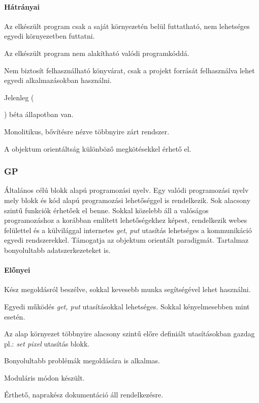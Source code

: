 \documentclass[12pt,a4paper,oneside]{report} %
\begin{document}
\paragraph{Hátrányai} 
\begin{compactitem}
	\item Az elkészült program csak a saját környezetén belül futtatható, nem lehetséges egyedi környezetben futtatni.
	\item Az elkészült program nem alakítható valódi programkóddá.
	\item Nem biztosít felhasználható könyvárat, csak a projekt forrását felhasználva lehet egyedi alkalmazásokban használni.
	\item Jelenleg (\date{\today}) béta állapotban van.
	\item Monolitikus, bővítésre nézve többnyire zárt rendszer.
	\item A objektum orientáltság különböző megkötésekkel érhető el.
\end{compactitem}

\subsubsection{GP} Általános célú blokk alapú \cite{ohshima2015module} \cite{monig2015blocks} programozási nyelv. Egy valódi programozási nyelv mely blokk és kód alapú programozási lehetőséggel is rendelkezik.  Sok alacsony szintű funkciók érhetőek el benne. Sokkal közelebb áll a valóságos programozáshoz a korábban említett lehetőségekhez képest, rendelkezik webes felülettel és a külvilággal internetes \textit{get}, \textit{put} utasítás lehetséges a kommunikáció egyedi rendszerekkel. Támogatja az objektum orientált paradigmát. Tartalmaz bonyolultabb adatszerkezeteket is.
\paragraph{Előnyei} 
\begin{compactitem}
	\item Kész megoldásról beszélve, sokkal kevesebb munka segítségével lehet használni.
	\item Egyedi működés \textit{get, put} utasításokkal lehetséges. \newline Sokkal kényelmesebben mint  esetén.
	\item Az alap környezet többnyire alacsony szintű előre definiált utasításokban gazdag pl.: \textit{set pixel} utasítás blokk.
	\item Bonyolultabb problémák megoldására is alkalmas.
	\item Moduláris módon készült.
	\item Érthető, naprakész dokumentáció áll rendelkezésre.
\end{compactitem}
\end{document}
